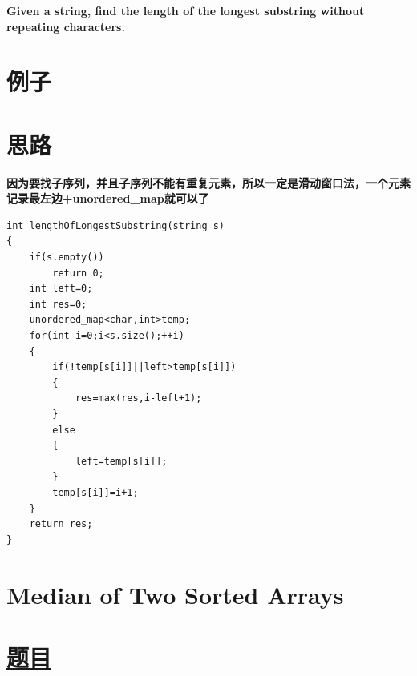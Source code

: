 \documentclass[a4paper, 11pt]{article} %
\begin{document}
\begin{spacing}{1.5}
{{  \textbf{Given a string, find the length of the longest substring without repeating characters.}

  }
  }
  \section*{例子}

\section*{思路}
\textbf{\color{blue}因为要找子序列，并且子序列不能有重复元素，所以一定是滑动窗口法，一个元素记录最左边+unordered\_map就可以了}
\begin{lstlisting}[caption={},frame=shadowbox]
    int lengthOfLongestSubstring(string s)
{
    if(s.empty())
        return 0;
    int left=0;
    int res=0;
    unordered_map<char,int>temp;
    for(int i=0;i<s.size();++i)
    {
        if(!temp[s[i]]||left>temp[s[i]])
        {
            res=max(res,i-left+1);
        }
        else
        {
            left=temp[s[i]];
        }
        temp[s[i]]=i+1;
    }
    return res;
}
\end{lstlisting}






\section{ Median of Two Sorted Arrays}
\section*{\href{https://leetcode.com/problems/median-of-two-sorted-arrays/}{题目} }
\fbox{%
  \parbox{\textwidth}{%

}}
\end{spacing}
\end{document}
